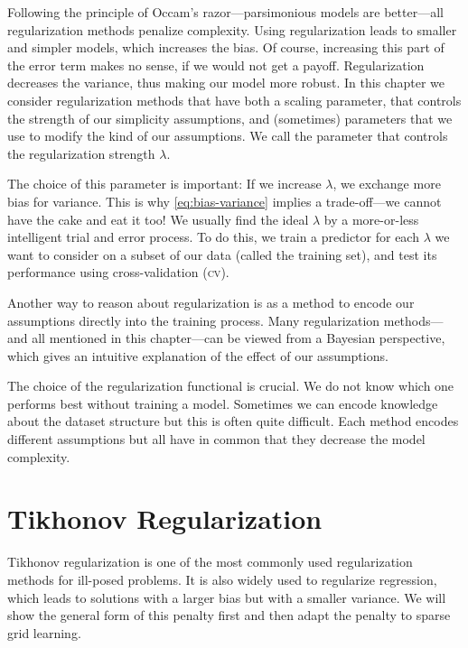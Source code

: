 Following the principle of Occam's razor---parsimonious models are better---all regularization methods penalize complexity.
Using regularization leads to smaller and simpler models, which increases the bias.
Of course, increasing this part of the error term makes no sense, if we would not get a payoff.
Regularization decreases the variance, thus making our model more robust.
In this chapter we consider regularization methods that have both a scaling
parameter, that controls the strength of our simplicity assumptions, and (sometimes) parameters that we use to modify the kind of our assumptions.
We call the parameter that controls the regularization strength \(\lambda\).

The choice of this parameter is important:
If we increase \(\lambda\), we exchange more bias for variance.
This is why \cref{eq:bias-variance} implies a trade-off---we cannot have the cake and eat it too!
We usually find the ideal \(\lambda\) by a more-or-less intelligent trial and error process.
To do this, we train a predictor for each \(\lambda\) we want to consider on a
subset of our data (called the training set), and test its performance using
cross-validation (\textsc{cv}). 

Another way to reason about regularization is as a method to encode our
assumptions directly into the training process.
Many regularization methods---and all mentioned in this chapter---can be
viewed from a Bayesian perspective, which gives an intuitive explanation of the
effect of our assumptions.

The choice of the regularization functional is crucial.
We do not know which one performs best without training a model.
Sometimes we can encode knowledge about the dataset structure but this is often
quite difficult.
Each method encodes different assumptions but all have in common that they
decrease the model complexity.

\section{Tikhonov Regularization}\label{cha:tikh}
Tikhonov regularization is one of the most commonly used regularization methods for ill-posed problems.
It is also widely used to regularize regression, which leads to solutions with a larger bias but with a smaller variance.
We will show the general form of this penalty first and then adapt the penalty to sparse grid learning.

